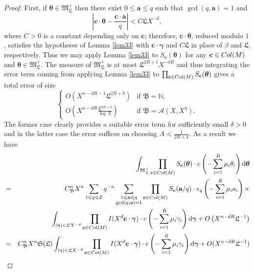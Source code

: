 \documentclass[reqno, 12pt, reqno]{amsart}
\numberwithin{equation}{section}
\renewcommand{\leq}{\leqslant}
\renewcommand{\c}{\mathbf{c}}
\renewcommand{\a}{\mathbf{a}}
\newcommand{\btheta}{\boldsymbol{\theta}}
\newcommand{\bgamma}{\boldsymbol{\gamma}}
\renewcommand{\=}{\equiv}
\begin{document}
\begin{proof}
First, if $\btheta \in \mathfrak{M}_\mathfrak{L}^+$ then there exist $0 \leq \a \leq q$ such that $\gcd(q, \a) = 1$ and
$$
\left| \c \cdot \btheta - \frac{ \c \cdot \a }{q} \right|  < C \mathfrak{L} X^{-d},
$$
where $C > 0$ is a constant depending only on $\c$; therefore, $\c \cdot \btheta$, reduced modulo $1$, satisfies the hypotheses of  Lemma \ref{lem33} with
$\c \cdot \bgamma$ and $C \mathfrak{L}$ in place of $\beta$ and $\mathfrak{L}$, respectively.
Thus we may apply Lemma  \ref{lem33} to $S_\c(\btheta)$ for any $\c \in \textnormal{Col}( M )$ and $\btheta \in \mathfrak{M}_\mathfrak{L}^+$.
The measure of $\mathfrak M_{\mathfrak L}^+$ is at most $\mathfrak L^{2R+1} X^{-dR}$ and thus integrating the error term
coming from applying Lemma \ref{lem33} to
$\prod_{\c \in \textnormal{Col}( M )} S_\c(\btheta)$
gives a total error of size
\[
\begin{cases}
O(X^{n-dR-1} \mathfrak{L}^{2R+3})  &\mbox{if } \mathfrak B = \mathbb N,\\
O(X^{n-dR} \frac{\mathfrak{L}^{2R+3}}{\log X}) &\mbox{if } \mathfrak B = \mathcal A(X, X^\eta).
\end{cases}
\]
The former case clearly provides a suitable error term for sufficiently small $\delta >0$ and in the latter case the error suffices on choosing $A < \frac{1}{2R+4}$.
As a result we have
\begin{eqnarray}
\label{major}
\notag
&&
\int_{  \mathfrak{M}^+_\mathfrak{L}  }  \prod_{\c \in \textnormal{Col}( M )} S_\c(\btheta) \cdot  e \left(-\sum_{i=1}^{R}  \mu_i  \theta_i    \right) \mathrm{d}\btheta
\\
\notag
&=& C_{\mathfrak{B}}^n X^n \sum_{1 \leq q \leq \mathfrak{L}}  q^{- n }  \sum_{ \substack{ 1 \leq  \a \leq  q \\ \gcd(q, \a) = 1  } }
 \prod_{\c \in \textnormal{Col}( M )} S_\c (\a /q)  \cdot e_q \left(-\sum_{i=1}^{R}   \mu_i  a_i   \right) \times
\\
\notag
&&\int_{\vert \bgamma \vert <  \mathfrak{L} X^{-d}}
\prod_{\c \in \textnormal{Col}( M )} I ( X^d \c\cdot\bgamma )  \cdot   e \left(-\sum_{i=1}^{R}  \mu_i  \gamma_i     \right) \mathrm{d}\bgamma
+ O \left(  X^{n  - d R} \mathfrak{L}^{- 1}\right)\\
\notag
&=&
C_{\mathfrak{B}}^n  X^n \mathfrak{S} (\mathfrak{L}) \int_{\vert \bgamma \vert <  \mathfrak{L} X^{-d}}
\prod_{\c \in \textnormal{Col}( M )} I (X^d \c\cdot \bgamma )  \cdot   e \left(-\sum_{i=1}^{R}  \mu_i  \gamma_i    \right) \mathrm{d}\bgamma
+ O ( X^{ n - d R} \mathfrak{L}^{ -1 }  )

\end{eqnarray}
\end{proof}
\end{document}
